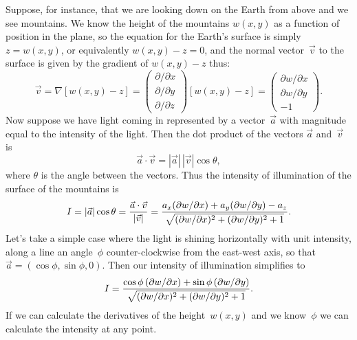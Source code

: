 \documentclass[12pt]{article}
\begin{document}
\begin{exercises}
Suppose, for instance, that we are looking down on the Earth from above and
we see mountains.  We know the height of the mountains $w(x,y)$ as a
function of position in the plane, so the equation for the Earth's
surface is simply $z=w(x,y)$, or equivalently $w(x,y)-z=0$, and the normal
vector~$\vec{v}$ to the surface is given by the gradient of $w(x,y)-z$
thus:
\begin{displaymath}
\vec{v} =
\nabla [w(x,y)-z] = \begin{pmatrix}
                  \partial/\partial x \\
                  \partial/\partial y \\
                  \partial/\partial z
                \end{pmatrix}
                [w(x,y)-z]
              = \begin{pmatrix}
                  \partial w/\partial x \\
                  \partial w/\partial y \\
                  -1
                \end{pmatrix}.
\end{displaymath}
Now suppose we have light coming in represented by a vector~$\vec{a}$ with
magnitude equal to the intensity of the light.  Then the dot product of the
vectors $\vec{a}$ and~$\vec{v}$ is
\begin{displaymath}
\vec{a}\cdot\vec{v} = |\vec{a}|\,|\vec{v}|\cos\theta,
\end{displaymath}
where $\theta$ is the angle between the vectors.  Thus the intensity of
illumination of the surface of the mountains is
\begin{displaymath}
I = |\vec{a}| \cos\theta = {\vec{a}\cdot\vec{v}\over|\vec{v}|}
  = {a_x (\partial w/\partial x)
   + a_y (\partial w/\partial y) - a_z\over
     \sqrt{(\partial w/\partial x)^2 + (\partial w/\partial y)^2 + 1}}.
\end{displaymath}
Let's take a simple case where the light is shining horizontally with unit
intensity, along a line an angle~$\phi$ counter-clockwise from the
east-west axis, so that $\vec{a}=(\cos\phi,\sin\phi,0)$.  Then our
intensity of illumination simplifies to
\begin{displaymath}
I = {\cos\phi\,(\partial w/\partial x) + \sin\phi\,(\partial w/\partial y)\over
     \sqrt{(\partial w/\partial x)^2 + (\partial w/\partial y)^2 + 1}}.
\end{displaymath}
If we can calculate the derivatives of the height~$w(x,y)$ and we
know~$\phi$ we can calculate the intensity at any point.


\end{exercises}
\end{document}
